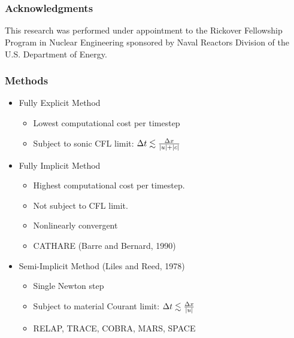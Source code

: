 \documentclass[compress,xcolor=table]{beamer}
\begin{document}
\section*{}
\begin{frame}
\frametitle{Acknowledgments}

This research was performed under appointment to the Rickover Fellowship Program in Nuclear Engineering sponsored by Naval Reactors Division of the U.S. Department of Energy.

\end{frame}
\begin{frame}
\frametitle{Methods}
\begin{itemize}
\item{Fully Explicit Method
\begin{itemize}
\item{Lowest computational cost per timestep}
\item{Subject to sonic CFL limit: $ \dt{} \lesssim \frac{\dx{}}{|u|+|c|}$}
\end{itemize}
}
\item{Fully Implicit Method
\begin{itemize}
\item{Highest computational cost per timestep.}
\item{Not subject to CFL limit.}
\item{Nonlinearly convergent}
\item{CATHARE (Barre and Bernard, 1990)}
\end{itemize}
}
\item{Semi-Implicit Method (Liles and Reed, 1978)
\begin{itemize}
\item{Single Newton step}
\item{Subject to material Courant limit: $ \dt{} \lesssim \frac{\dx{}}{|u|}$}
\item{RELAP, TRACE, COBRA, MARS, SPACE} 
\end{itemize}
}
\end{itemize}
\end{frame}
\end{document}
